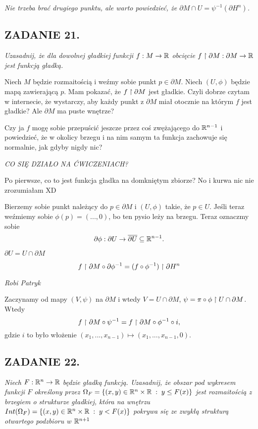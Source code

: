 \emph{Nie trzeba brać drugiego punktu, ale warto powiedzieć, że $\partial M\cap U=\psi^{-1}(\partial H^n)$.}

\subsection*{ZADANIE 21.}
\emph{\color{yellow}Uzasadnij, że dla dowolnej gładkiej funkcji $f:M\to\mathbb{R}$ obcięcie $f\upharpoonright \partial M:\partial M\to\mathbb{R}$ jest funkcją gładką.}
\smallskip

Niech $M$ będzie rozmaitością i weźmy sobie punkt $p\in\partial M$. Niech $(U, \phi)$ będzie mapą zawierającą $p$. Mam pokazać, że $f\upharpoonright \partial M$ jest gładkie. Czyli dobrze czytam w internecie, że wystarczy, aby każdy punkt z $\partial M$ miał otocznie na którym $f$ jest gładkie? Ale $\partial M$ ma puste wnętrze?

Czy ja $f$ mogę sobie przepuścić jeszcze przez coś zwężającego do $\mathbb{R}^{n-1}$ i powiedzieć, że w okolicy brzegu i na nim samym ta funkcja zachowuje się normalnie, jak gdyby nigdy nic?

\emph{CO SIĘ DZIAŁO NA ĆWICZENIACH?}

Po pierwsze, co to jest funkcja gładka na domkniętym zbiorze? No i kurwa nic nie
zrozumiałam XD

Bierzemy sobie punkt należący do $p\in\partial M$ i $(U,\phi)$ takie, że $p\in U$. Jeśli
teraz weźmiemy sobie $\phi(p)=(...,0)$, bo ten pysio leży na brzegu. Teraz oznaczmy sobie
$$\partial\phi:\partial U\to\overline{\partial U}\subseteq\mathbb{R}^{n-1}.$$

$\partial U=U\cap\partial M$

$$f\upharpoonright\partial M\circ\partial\phi^{-1}=(f\circ\phi^{-1})\upharpoonright\partial H^n$$

\emph{Robi Patryk}

Zaczynamy od mapy $(V,\psi)$  na $\partial M$ i wtedy $V=U\cap\partial M$,
$\psi=\pi\circ\phi\upharpoonright U\cap\partial M$. Wtedy 
$$f\upharpoonright\partial M\circ\psi^{-1}=f\upharpoonright\partial M\circ\phi^{-1}\circ i,$$
gdzie $i$ to było włożenie $(x_1,...,x_{n-1})\mapsto (x_1,...,x_{n-1},0)$.


\subsection*{ZADANIE 22.}
\emph{\color{yellow}Niech $F:\mathbb{R}^n\to\mathbb{R}$ będzie gładką funkcją. Uzasadnij, że obszar pod wykresem funkcji $F$ określony przez $\Omega_F=\{(x,y)\in\mathbb{R}^n\times\mathbb{R}\;:\;y\leq F(x)\}$ jest rozmaitością z brzegiem o strukturze gładkiej, która na wnętrzu $Int(\Omega_F)=\{(x,y)\in\mathbb{R}^n\times\mathbb{R}\;:\;y<F(x)\}$ pokrywa się ze zwykłą strukturą otwartego podzbioru w $\mathbb{R}^{n+1}$}
\smallskip


